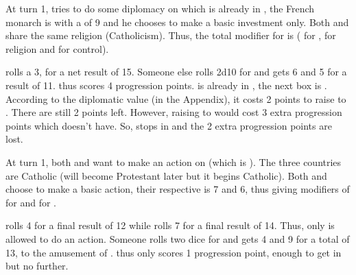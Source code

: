 \begin{exemple}
  At turn 1, \FRA tries to do some diplomacy on \paysSavoie which is already
  in \MA, the French monarch is  with a \DIP of 9 and
  he chooses to make a basic investment only. Both \FRA and \paysSavoie share
  the same religion (Catholicism). Thus, the total modifier for \FRA is
   ( for \DIP,  for religion and  for
  control).

  \FRA rolls a 3, for a net result of 15. Someone else rolls 2d10 for
  \paysSavoie and gets 6 and 5 for a result of 11. \FRA thus scores 4
  progression points. \paysSavoie is already in \MA, the next box is
  \EC. According to the diplomatic value (in the Appendix), it costs 2 points
  to raise \paysSavoie to \EC. There are still 2 points left. However, raising
  \paysSavoie to \EW would cost 3 extra progression points which \FRA doesn't
  have. So, \paysSavoie stops in \EC and the 2 extra progression points are
  lost.
\end{exemple}

\begin{exemple}
  At turn 1, both \ANG and \HIS want to make an action on \paysPalatinat
  (which is \Neutral). The three countries are Catholic (\paysPalatinat will
  become Protestant later but it begins Catholic). Both \ANG and \HIS choose
  to make a basic action, their respective \DIP is 7 and 6, thus giving
  modifiers of  for \ANG and  for \HIS.

  \ANG rolls 4 for a final result of 12 while \HIS rolls 7 for a final result
  of 14. Thus, only \HIS is allowed to do an action. Someone rolls two dice
  for \paysPalatinat and gets 4 and 9 for a total of 13, to the amusement of
  \ANG. \HIS thus only scores 1 progression point, enough to get
  \paysPalatinat in \RM but no further.
\end{exemple}

